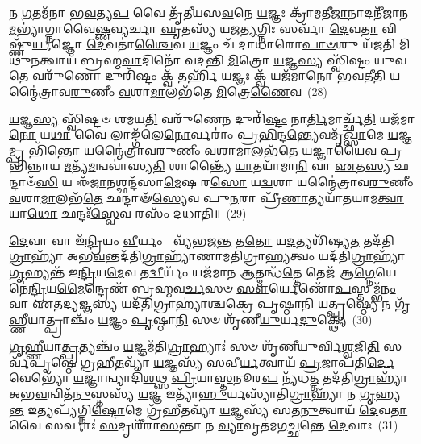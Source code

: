 𑌨 \ul{𑌗}\-𑌤𑌮᳴𑌨𑌾 𑌭\-\ul{𑌵}\-𑌤𑍍𑌯\-\ul{𑌪} 𑌵𑍈 𑌤𑍃᳴𑌤𑍀𑌯𑌸\-\ul{𑌵}\-𑌨𑍇 \ul{𑌯}\-𑌜𑍍𑌞𑌃 𑌕𑍍𑌰𑌾᳴𑌮𑌤𑍀\-\ul{𑌜𑌾}\-𑌨𑌾𑌦𑌨𑍀᳴𑌜𑌾𑌨\-\ul{𑌮}\-𑌭𑍍𑌯𑌾॑𑌗𑍍𑌨𑌾𑌵𑍈\-\ul{𑌷𑍍𑌣}\-𑌵𑍍𑌯𑌰𑍍𑌚𑌾 \ul{𑌘𑍃}\-𑌤𑌸𑍍𑌯᳴ 𑌯𑌜\-\ul{𑌤𑍍𑌯}\-𑌗𑍍𑌨𑌿𑌃 𑌸𑌰𑍍𑌵𑌾᳴ \ul{𑌦𑍇}\-𑌵\-\ul{𑌤𑌾} 𑌵𑌿𑌷𑍍𑌣𑍁᳴\-\ul{𑌰𑍍𑌯}\-𑌜𑍍𑌞𑍋 \ul{𑌦𑍇}\-𑌵𑌤𑌾॑\-\ul{𑌶𑍍𑌚𑍈}\-𑌵 \ul{𑌯}\-𑌜𑍍𑌞𑌂 𑌚᳴ 𑌦𑌾𑌧𑌾𑌰𑍋\-\ul{𑌪𑌾}\-\-\ul{𑍞}\-𑌶𑍁 𑌯᳴𑌜𑌤𑌿 𑌮𑌿𑌥𑍁\-\ul{𑌨}\-𑌤𑍍𑌵𑌾𑌯᳴ 𑌬𑍍𑌰𑌹𑍍𑌮\-\ul{𑌵𑌾}\-𑌦𑌿𑌨𑍋᳴ 𑌵𑌦𑌨𑍍𑌤𑌿 \ul{𑌮𑌿}\-𑌤𑍍𑌰𑍋 \ul{𑌯}\-𑌜𑍍𑌞\-\ul{𑌸𑍍𑌯} 𑌸𑍍𑌵𑌿᳴𑌷𑍍𑌟𑌂 𑌯𑍁𑌵\-\ul{𑌤𑍇} 𑌵𑌰𑍁᳴\-\ul{𑌣𑍋} 𑌦𑍁𑌰𑌿᳴\-\ul{𑌷𑍍𑌟𑌂} 𑌕𑍍𑌵᳴ 𑌤𑌰𑍍\mbox{}𑌹𑌿᳴ \ul{𑌯}\-𑌜𑍍𑌞𑌃 𑌕𑍍𑌵᳴ 𑌯𑌜᳴𑌮𑌾𑌨𑍋 𑌭\-\ul{𑌵}\-𑌤𑍀\-\ul{𑌤𑌿} 𑌯𑌨𑍍𑌮𑍈॑𑌤𑍍𑌰𑌾𑌵\-\ul{𑌰𑍁}\-𑌣𑍀𑌂 \ul{𑌵}\-𑌶𑌾\-\ul{𑌮𑌾}\-𑌲𑌭᳴𑌤𑍇 \ul{𑌮𑌿}\-𑌤𑍍𑌰𑍇\-\ul{𑌣𑍈}\-𑌵~(28)

\-\ul{𑌯}\-𑌜𑍍𑌞\-\ul{𑌸𑍍𑌯} 𑌸𑍍𑌵𑌿᳴𑌷𑍍𑌟𑍞 𑌶𑌮𑌯\-\ul{𑌤𑌿} 𑌵𑌰𑍁᳴𑌣𑍇\-\ul{𑌨} 𑌦𑍁𑌰𑌿᳴\-\ul{𑌷𑍍𑌟𑌂} 𑌨𑌾\-\ul{𑌰𑍍𑌤𑌿}\-𑌮𑌾𑌰𑍍𑌚𑍍𑌛᳴\-\ul{𑌤𑌿} 𑌯𑌜᳴𑌮𑌾\-\ul{𑌨𑍋} 𑌯\-\ul{𑌥𑌾} 𑌵𑍈 𑌲𑌾𑌙𑍍𑌗᳴𑌲𑍇\-\ul{𑌨𑍋}\-𑌰𑍍𑌵𑌰𑌾𑌂॑ 𑌪𑍍𑌰\-\ul{𑌭𑌿}\-𑌨𑍍𑌦\-\ul{𑌨𑍍𑌤𑍍𑌯𑍇}\-𑌵𑌮𑍃᳴\-\ul{𑌖𑍍𑌸𑌾}\-𑌮𑍇 \ul{𑌯}\-𑌜𑍍𑌞𑌮𑍍𑌪𑍍𑌰 𑌭𑌿᳴\-\ul{𑌨𑍍𑌤𑍋} 𑌯𑌨𑍍𑌮𑍈॑𑌤𑍍𑌰𑌾𑌵\-\ul{𑌰𑍁}\-𑌣𑍀𑌂 \ul{𑌵}\-𑌶𑌾\-\ul{𑌮𑌾}\-𑌲𑌭᳴𑌤𑍇 \ul{𑌯}\-𑌜𑍍𑌞𑌾\-\ul{𑌯𑍈}\-𑌵 𑌪𑍍𑌰𑌭𑌿᳴𑌨𑍍𑌨𑌾𑌯 \ul{𑌮}\-𑌤𑍍𑌯᳴\-\ul{𑌮}\-𑌨𑍍𑌵𑌵𑌾॑𑌸𑍍𑌯\-\ul{𑌤𑌿} 𑌶𑌾𑌨𑍍𑌤𑍍𑌯𑍈᳴ \ul{𑌯𑌾}\-𑌤𑌯𑌾᳴𑌮𑌾\-\ul{𑌨𑌿} 𑌵𑌾 \ul{𑌏}\-𑌤\-\ul{𑌸𑍍𑌯} 𑌛𑌨𑍍𑌦𑌾𑍞᳴\-\ul{𑌸𑌿} 𑌯 𑌈᳴\-\ul{𑌜𑌾}\-𑌨𑌶𑍍𑌛𑌨𑍍𑌦᳴𑌸𑌾\-\ul{𑌮𑍇}\-𑌷 𑌰\-\ul{𑌸𑍋} 𑌯\-\ul{𑌦𑍍𑌵}\-𑌶𑌾 𑌯𑌨𑍍𑌮𑍈॑𑌤𑍍𑌰𑌾𑌵\-\ul{𑌰𑍁}\-𑌣𑍀𑌂 \ul{𑌵}\-𑌶𑌾\-\ul{𑌮𑌾}\-𑌲𑌭᳴\-\ul{𑌤𑍇} 𑌛𑌨𑍍𑌦𑌾𑍟᳴\-\ul{𑌸𑍍𑌯𑍇}\-𑌵 𑌪𑍁\-\ul{𑌨}\-𑌰𑌾 𑌪𑍍𑌰𑍀᳴\-\ul{𑌣𑌾}\-𑌤𑍍𑌯𑌯𑌾᳴𑌤𑌯𑌾𑌮\-\ul{𑌤𑍍𑌵𑌾}\-𑌯𑌾\-\ul{𑌥𑍋} 𑌛𑌨𑍍𑌦𑌃᳴\-\ul{𑌸𑍍𑌵𑍇}\-𑌵 𑌰𑌸𑌂᳴ 𑌦𑌧𑌾𑌤𑌿॥~(29)

{\anuvakamend[{𑌅𑌵᳴ 𑌦𑌾𑌧𑌾𑌰 \ul{𑌮𑌿}\-𑌤𑍍𑌰𑍇\-\ul{𑌣𑍈}\-𑌵 𑌪𑍍𑌰𑍀᳴𑌣𑌾\-\ul{𑌤𑌿} 𑌷𑌟𑍍𑌚᳴}]}%

\-\ul{𑌦𑍇}\-𑌵𑌾 𑌵𑌾 𑌇᳴\-\ul{𑌨𑍍𑌦𑍍𑌰𑌿}\-𑌯𑌂 \ul{𑌵𑍀}\-𑌰𑍍𑌯𑌂  𑌵𑍍𑌯᳴𑌭𑌜\-\ul{𑌨𑍍𑌤} 𑌤\-\ul{𑌤𑍋} 𑌯\-\ul{𑌦}\-𑌤𑍍𑌯𑌶𑌿᳴𑌷𑍍𑌯\-\ul{𑌤} 𑌤𑌦᳴𑌤𑌿\-\ul{𑌗𑍍𑌰𑌾}\-𑌹𑍍𑌯𑌾᳴ 𑌅𑌭\-\ul{𑌵}\-𑌨𑍍𑌤𑌦᳴𑌤𑌿\-\ul{𑌗𑍍𑌰𑌾}\-𑌹𑍍𑌯𑌾᳴𑌣𑌾𑌮𑌤𑌿𑌗𑍍𑌰𑌾\-\ul{𑌹𑍍𑌯}\-𑌤𑍍𑌵𑌂 𑌯𑌦᳴𑌤𑌿\-\ul{𑌗𑍍𑌰𑌾}\-𑌹𑍍𑌯𑌾᳴ \ul{𑌗𑍃}\-𑌹𑍍𑌯𑌨𑍍𑌤᳴ 𑌇\-\ul{𑌨𑍍𑌦𑍍𑌰𑌿}\-𑌯\-\ul{𑌮𑍇}\-𑌵 𑌤\-\ul{𑌦𑍍𑌵𑍀}\-𑌰𑍍𑌯𑌂᳴ 𑌯𑌜᳴𑌮𑌾𑌨 \ul{𑌆}\-𑌤𑍍𑌮𑌨𑍍𑌧᳴\-\ul{𑌤𑍍𑌤𑍇} 𑌤𑍇𑌜᳴ 𑌆\-\ul{𑌗𑍍𑌨𑍇}\-𑌯𑍇𑌨𑍇॑\-\ul{𑌨𑍍𑌦𑍍𑌰𑌿}\-𑌯\-\ul{𑌮𑍈}\-𑌨𑍍𑌦𑍍𑌰𑍇𑌣᳴ 𑌬𑍍𑌰𑌹𑍍𑌮𑌵\-\ul{𑌰𑍍𑌚}\-𑌸𑍞 \ul{𑌸𑍗}\-𑌰𑍍𑌯𑍇𑌣𑍋᳴\-\ul{𑌪}\-𑌸𑍍𑌤𑌮𑍍𑌭᳴\-\ul{𑌨𑌂} 𑌵𑌾 \ul{𑌏}\-𑌤\-\ul{𑌦𑍍𑌯}\-𑌜𑍍𑌞\-\ul{𑌸𑍍𑌯} 𑌯𑌦᳴𑌤𑌿\-\ul{𑌗𑍍𑌰𑌾}\-𑌹𑍍𑌯𑌾॑\-\ul{𑌶𑍍𑌚}\-𑌕𑍍𑌰𑍇 \ul{𑌪𑍃}\-𑌷𑍍𑌠𑌾\-\ul{𑌨𑌿} 𑌯𑌤𑍍𑌪𑍃\-\ul{𑌷𑍍𑌠𑍍𑌯𑍇} 𑌨 𑌗𑍃᳴\-\ul{𑌹𑍍𑌣𑍀}\-𑌯𑌾𑌤𑍍𑌪𑍍𑌰𑌾𑌞𑍍𑌚𑌂᳴ \ul{𑌯}\-𑌜𑍍𑌞𑌂 \ul{𑌪𑍃}\-𑌷𑍍𑌠𑌾\-\ul{𑌨𑌿} 𑌸𑍞 𑌶𑍃᳴𑌣𑍀\-\ul{𑌯𑍁}\-𑌰𑍍𑌯\-\ul{𑌦𑍁}\-𑌕𑍍𑌥𑍍𑌯𑍇॑~(30)

\-\ul{𑌗𑍃}\-\-\ul{𑌹𑍍𑌣𑍀}\-𑌯𑌾\-\ul{𑌤𑍍𑌪𑍍𑌰}\-𑌤𑍍𑌯𑌞𑍍𑌚𑌂᳴ \ul{𑌯}\-𑌜𑍍𑌞𑌮᳴𑌤𑌿\-\ul{𑌗𑍍𑌰𑌾}\-𑌹𑍍𑌯𑌾𑌃॑ 𑌸𑍞 𑌶𑍃᳴𑌣𑍀𑌯𑍁𑌰𑍍𑌵𑌿\-\ul{𑌶𑍍𑌵}\-𑌜𑌿\-\ul{𑌤𑌿} 𑌸𑌰𑍍𑌵᳴𑌪𑍃𑌷𑍍𑌠𑍇 𑌗𑍍𑌰𑌹𑍀\-\ul{𑌤}\-𑌵𑍍𑌯𑌾᳴ \ul{𑌯}\-𑌜𑍍𑌞𑌸𑍍𑌯᳴ 𑌸𑌵𑍀\-\ul{𑌰𑍍𑌯}\-𑌤𑍍𑌵𑌾𑌯᳴ \ul{𑌪𑍍𑌰}\-𑌜𑌾𑌪᳴𑌤𑌿\-\ul{𑌰𑍍𑌦𑍇}\-𑌵𑍇𑌭𑍍𑌯𑍋᳴ \ul{𑌯}\-𑌜𑍍𑌞𑌾𑌨𑍍𑌵𑍍𑌯𑌾𑌦𑌿᳴\-\ul{𑌶}\-𑌥𑍍𑌸 \ul{𑌪𑍍𑌰𑌿}\-𑌯𑌾\-\ul{𑌸𑍍𑌤}\-𑌨𑍂𑌰\-\ul{𑌪} 𑌨𑍍𑌯᳴𑌧\-\ul{𑌤𑍍𑌤} 𑌤𑌦᳴𑌤𑌿\-\ul{𑌗𑍍𑌰𑌾}\-𑌹𑍍𑌯𑌾᳴ 𑌅𑌭\-\ul{𑌵}\-𑌨𑍍𑌵𑌿𑌤᳴\-\ul{𑌨𑍁}\-𑌸𑍍𑌤𑌸𑍍𑌯᳴ \ul{𑌯}\-𑌜𑍍𑌞 𑌇𑌤𑍍𑌯𑌾᳴\-\ul{𑌹𑍁}\-𑌰𑍍𑌯𑌸𑍍𑌯𑌾᳴𑌤𑌿\-\ul{𑌗𑍍𑌰𑌾}\-𑌹𑍍𑌯𑌾᳴ 𑌨 \ul{𑌗𑍃}\-𑌹𑍍𑌯\-\ul{𑌨𑍍𑌤} 𑌇𑌤𑍍𑌯𑌪𑍍𑌯᳴𑌗𑍍𑌨𑌿\-\ul{𑌷𑍍𑌟𑍋}\-𑌮𑍇 𑌗𑍍𑌰᳴𑌹𑍀\-\ul{𑌤}\-𑌵𑍍𑌯𑌾᳴ \ul{𑌯}\-𑌜𑍍𑌞𑌸𑍍𑌯᳴ 𑌸𑌤\-\ul{𑌨𑍁}\-𑌤𑍍𑌵𑌾𑌯᳴ \ul{𑌦𑍇}\-𑌵\-\ul{𑌤𑌾} 𑌵𑍈 𑌸𑌰𑍍𑌵𑌾𑌃॑ \ul{𑌸}\-𑌦𑍃𑌶𑍀᳴𑌰𑌾\-\ul{𑌸}\-𑌨𑍍𑌤𑌾 𑌨 \ul{𑌵𑍍𑌯𑌾}\-𑌵𑍃𑌤॑𑌮𑌗\-\ul{𑌚𑍍𑌛}\-𑌨𑍍𑌤𑍇 \ul{𑌦𑍇}\-𑌵𑌾𑌃~(31)

